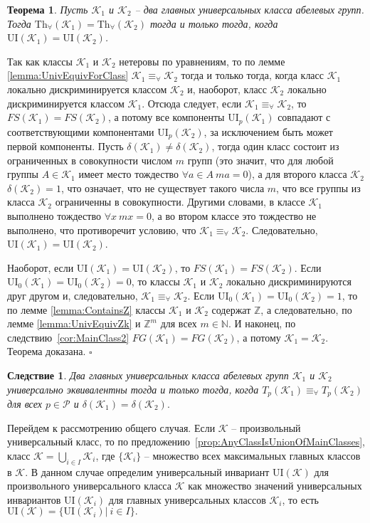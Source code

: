 \documentclass[a4paper,11pt,twoside]{article}
\newtheorem{theorem}{Теорема}[section]
\newtheorem{corollary}{Следствие}[section]
\def\proof{{\noindent{\bf Доказательство.}} }
\def\K{{\mathcal{K}}}
\def\P{{\mathcal{P}}}
\def\Z{{\mathbb{Z}}}
\def\N{{\mathbb{N}}}
\def\Tha{{\mathrm{Th}_\forall}}
\def\ui{{\mathrm{UI}}}
\begin{document}
\begin{theorem}\label{th:UnivEquivMainClasses}
Пусть $\K_1$ и $\K_2$ -- два главных универсальных класса абелевых групп. Тогда $\Tha(\K_1) = \Tha(\K_2)$ тогда и только тогда, когда $\ui(\K_1) = \ui(\K_2)$.
\end{theorem}
\proof Так как классы $\K_1$ и $\K_2$ нетеровы по уравнениям, то по лемме \ref{lemma:UnivEquivForClass} $\K_1 \equiv_\forall \K_2$ тогда и только тогда, когда класс $\K_1$ локально дискриминируется классом $\K_2$ и, наоборот, класс $\K_2$ локально дискриминируется классом $\K_1$. Отсюда следует, если $\K_1 \equiv_\forall \K_2$, то $FS(\K_1) = FS(\K_2)$, а потому все компоненты $\ui_p(\K_1)$ совпадают с соответствующими компонентами $\ui_p(\K_2)$, за исключением быть может первой компоненты. Пусть $\delta(\K_1) \neq \delta(\K_2)$, тогда один класс состоит из ограниченных в совокупности числом $m$ групп (это значит, что для любой группы $A \in \K_1$ имеет место тождество $\forall a \in A \ ma = 0$), а для второго класса $\K_2$ $\delta(\K_2) = 1$, что означает, что не существует такого числа $m$, что все группы из класса $\K_2$ ограниченны в совокупности. Другими словами, в классе $\K_1$ выполнено тождество $\forall x \ mx = 0$, а во втором классе это тождество не выполнено, что противоречит условию, что $\K_1 \equiv_\forall \K_2$. Следовательно, $\ui(\K_1) = \ui(\K_2)$.

Наоборот, если $\ui(\K_1) = \ui(\K_2)$, то $FS(\K_1) = FS(\K_2)$. Если $\ui_0(\K_1) = \ui_0(\K_2) = 0$, то классы $\K_1$ и $\K_2$ локально дискриминируются друг другом и, следовательно, $\K_1 \equiv_\forall \K_2$. Если $\ui_0(\K_1) = \ui_0(\K_2) = 1$, то по лемме \ref{lemma:ContainsZ} классы $\K_1$ и $\K_2$ содержат $\Z$, а следовательно, по лемме \ref{lemma:UnivEquivZk} и $\Z^m$ для всех $m \in \N$. И наконец, по следствию~\ref{cor:MainClass2} $FG(\K_1) = FG(\K_2)$, а потому $\K_1 = \K_2$. Теорема доказана. $\square$

\begin{corollary}
Два главных универсальных класса абелевых групп $\K_1$ и $\K_2$ универсально эквивалентны тогда и только тогда, когда $T_p(\K_1) \equiv_\forall T_p(\K_2)$ для всех $p \in \P$ и $\delta(\K_1) = \delta(\K_2).$
\end{corollary}

Перейдем к рассмотрению общего случая. Если $\K$ -- произвольный универсальный класс, то по предложению~\ref{prop:AnyClassIsUnionOfMainClasses}, класс $\K = \bigcup\limits_{i \in I} \K_i$, где $\{\K_i\}$ -- множество всех максимальных главных классов в $\K$. В данном случае определим универсальный инвариант $\ui(\K)$ для произвольного универсального класса $\K$ как множество значений универсальных инвариантов $\ui(\K_i)$ для главных универсальных классов $\K_i$, то есть $\ui(\K) = \{\ui(\K_i) | \ i \in I\}.$
\end{document}
